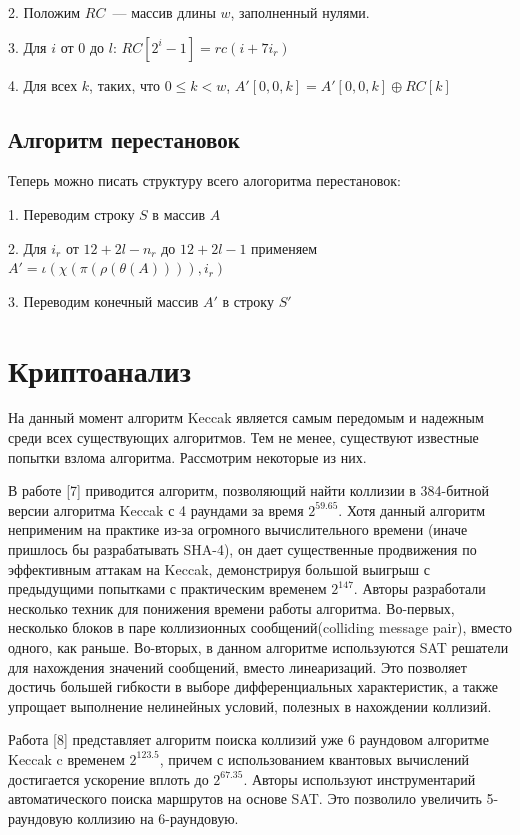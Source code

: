 \documentclass[a4paper,12pt]{article}
\theoremstyle{plain} %
\theoremstyle{definition} %
\theoremstyle{remark} %
\begin{document}
	2. Положим $RC$ — массив длины $w$, заполненный нулями.
	
	3. Для $i$ от 0 до $l$: $RC[2^i - 1] = rc(i + 7i_r)$
	
	4. Для всех $k$, таких, что $0 \leqslant k < w$, $A'[0,0,k] = A'[0,0,k] \oplus RC[k]$
	
	\subsection{Алгоритм перестановок}
	
	Теперь можно писать структуру всего алогоритма перестановок:
	
	1. Переводим строку $S$ в массив $A$
	
	2. Для $i_r$ от $12 + 2l - n_r$ до $12 + 2l - 1$ применяем $A' = \iota(\chi(\pi(\rho(\theta(A)))), i_r)$
	
	3. Переводим конечный массив $A'$ в строку $S'$
	
	
	\section{Криптоанализ}
	
	На данный момент алгоритм Keccak является самым передомым и надежным среди всех существующих алгоритмов. Тем не менее, существуют известные попытки взлома алгоритма. Рассмотрим некоторые из них.
	
	В работе [7] приводится алгоритм, позволяющий найти коллизии в 384-битной версии алгоритма Keccak с 4 раундами за время $2^{59.65}$. Хотя данный алгоритм неприменим на практике из-за огромного вычислительного времени (иначе пришлось бы разрабатывать SHA-4), он дает существенные продвижения по эффективным аттакам на Keccak, демонстрируя большой выигрыш с предыдущими попытками с практическим временем $2^{147}$. Авторы разработали несколько техник для понижения времени работы алгоритма. Во-первых, несколько блоков в паре коллизионных сообщений(colliding message pair), вместо одного, как раньше. Во-вторых, в данном алгоритме используются SAT решатели для нахождения значений сообщений, вместо линеаризаций. Это позволяет достичь большей гибкости в выборе дифференциальных характеристик, а также упрощает выполнение нелинейных условий, полезных в нахождении коллизий.  
	
	Работа [8] представляет алгоритм поиска коллизий уже 6 раундовом алгоритме Keccak c временем $2^{123.5}$, причем с использованием квантовых вычислений достигается ускорение вплоть до $2^{67.35}$. Авторы используют инструментарий автоматического поиска маршрутов на основе SAT. Это позволило увеличить 5-раундовую коллизию на 6-раундовую. 
	
\end{document}
